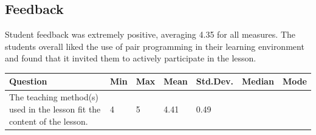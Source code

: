 \documentclass[paper=a4,justified,a4paper]{tufte-handout}
\begin{document}
\hypertarget{feedback}{%
\subsection{Feedback}\label{feedback}}

Student feedback was extremely positive, averaging 4.35 for all
measures. The students overall liked the use of pair programming in
their learning environment and found that it invited them to actively
participate in the lesson.

\begin{longtable}[]{@{}lllllll@{}}
\toprule
\begin{minipage}[b]{0.18\columnwidth}\raggedright
Question\strut
\end{minipage} & \begin{minipage}[b]{0.07\columnwidth}\raggedright
Min\strut
\end{minipage} & \begin{minipage}[b]{0.07\columnwidth}\raggedright
Max\strut
\end{minipage} & \begin{minipage}[b]{0.09\columnwidth}\raggedright
Mean\strut
\end{minipage} & \begin{minipage}[b]{0.18\columnwidth}\raggedright
Std.Dev.\strut
\end{minipage} & \begin{minipage}[b]{0.13\columnwidth}\raggedright
Median\strut
\end{minipage} & \begin{minipage}[b]{0.09\columnwidth}\raggedright
Mode\strut
\end{minipage}\tabularnewline
\midrule
\endhead
\begin{minipage}[t]{0.18\columnwidth}\raggedright
\scriptsize The teaching method(s) used in the lesson fit the content of
the lesson.\strut
\end{minipage} & \begin{minipage}[t]{0.07\columnwidth}\raggedright
4\strut
\end{minipage} & \begin{minipage}[t]{0.07\columnwidth}\raggedright
5\strut
\end{minipage} & \begin{minipage}[t]{0.09\columnwidth}\raggedright
4.41\strut
\end{minipage} & \begin{minipage}[t]{0.18\columnwidth}\raggedright
0.49\strut
\end{minipage} & \begin{minipage}[t]{0.13\columnwidth}\raggedright

\end{minipage}
\end{longtable}
\end{document}
